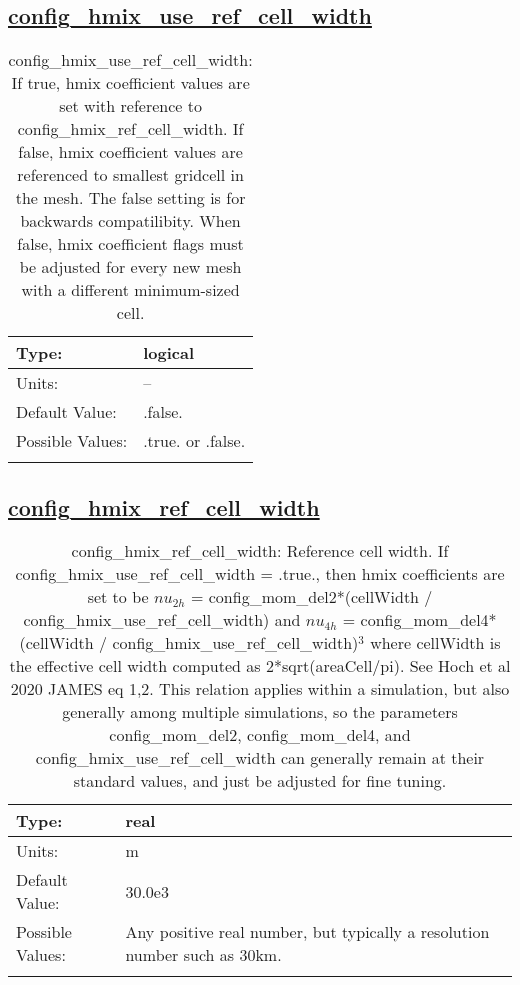 \subsection[config\_hmix\_use\_ref\_cell\_width]{\hyperref[sec:nm_tab_hmix]{config\_hmix\_use\_ref\_cell\_width}}
\label{subsec:nm_sec_config_hmix_use_ref_cell_width}
\begin{center}
\begin{longtable}{| p{2.0in} || p{4.0in} |}
    \hline
    Type: & logical \\
    \hline
    Units: & -- \\
    \hline
    Default Value: & .false. \\
    \hline
    Possible Values: & .true. or .false. \\
    \hline
    \caption{config\_hmix\_use\_ref\_cell\_width: If true, hmix coefficient values are set with reference to config\_hmix\_ref\_cell\_width. If false, hmix coefficient values are referenced to smallest gridcell in the mesh. The false setting is for backwards compatilibity. When false, hmix coefficient flags must be adjusted for every new mesh with a different minimum-sized cell.}
\end{longtable}
\end{center}
\subsection[config\_hmix\_ref\_cell\_width]{\hyperref[sec:nm_tab_hmix]{config\_hmix\_ref\_cell\_width}}
\label{subsec:nm_sec_config_hmix_ref_cell_width}
\begin{center}
\begin{longtable}{| p{2.0in} || p{4.0in} |}
    \hline
    Type: & real \\
    \hline
    Units: & \si{m} \\
    \hline
    Default Value: & 30.0e3 \\
    \hline
    Possible Values: & Any positive real number, but typically a resolution number such as 30km. \\
    \hline
    \caption{config\_hmix\_ref\_cell\_width: Reference cell width. If config\_hmix\_use\_ref\_cell\_width = .true., then hmix coefficients are set to be $nu_{2h}$ = config\_mom\_del2*(cellWidth / config\_hmix\_use\_ref\_cell\_width) and $nu_{4h}$ = config\_mom\_del4*(cellWidth / config\_hmix\_use\_ref\_cell\_width)$^3$ where cellWidth is the effective cell width computed as 2*sqrt(areaCell/pi). See Hoch et al 2020 JAMES eq 1,2. This relation applies within a simulation, but also generally among multiple simulations, so the parameters config\_mom\_del2, config\_mom\_del4, and config\_hmix\_use\_ref\_cell\_width can generally remain at their standard values, and just be adjusted for fine tuning.}
\end{longtable}
\end{center}
